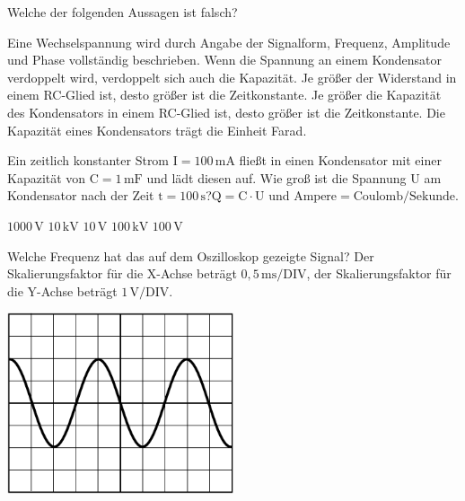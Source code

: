 \documentclass[11pt]{exam}
\begin{document}
\setlength{\voffset}{-0.5in}
\setlength{\headsep}{5pt}

\hspace{2mm}
 \hspace{5mm}
\vspace{4mm}

\begin{questions}

\question Welche der folgenden Aussagen ist falsch?

\begin{choices}
	\choice Eine Wechselspannung wird durch Angabe der Signalform, Frequenz, Amplitude und Phase vollständig beschrieben.
	\choice Wenn die Spannung an einem Kondensator verdoppelt wird, verdoppelt sich auch die Kapazität.
	\choice Je größer der Widerstand in einem RC-Glied ist, desto größer ist die Zeitkonstante.
	\choice Je größer die Kapazität des Kondensators in einem RC-Glied ist, desto größer ist die Zeitkonstante.
	\choice Die Kapazität eines Kondensators trägt die Einheit Farad.
\end{choices}

\vspace{3mm}\question Ein zeitlich konstanter Strom \(\mathrm{I=100\,mA}\) fließt in einen Kondensator mit einer Kapazität von \(\mathrm{C=1\,mF}\) und lädt diesen auf. Wie groß ist die Spannung \(\mathrm{U}\) am Kondensator nach der Zeit \(\mathrm{t=100\,s}\)?\(\mathrm{Q=C \cdot U}\) und \(\mathrm{Ampere=Coulomb/Sekunde}\).

\begin{choices}
	\choice \(\mathrm{1000\,V}\)
	\choice \(\mathrm{10\,kV}\)
	\choice \(\mathrm{10\,V}\)
	\choice \(\mathrm{100\,kV}\)
	\choice \(\mathrm{100\,V}\)
\end{choices}

\vspace{3mm}\question Welche Frequenz hat das auf dem Oszilloskop gezeigte Signal? Der Skalierungsfaktor für die X-Achse beträgt \(\mathrm{0,5\,ms/DIV}\), der Skalierungsfaktor für die Y-Achse beträgt \(\mathrm{1\,V/DIV}\). 

\includegraphics[width=0.5\textwidth]{../../../questions/D/images/Oszi1.png}


\end{questions}
\end{document}
